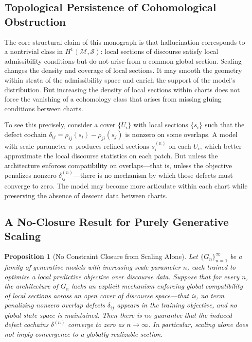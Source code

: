 \documentclass[11pt, oneside]{article}
\newtheorem{proposition}{Proposition}
\begin{document}
\subsection{Topological Persistence of Cohomological Obstruction}

The core structural claim of this monograph is that hallucination corresponds to a nontrivial class in $H^1(\mathcal{M}, \mathcal{S})$: local sections of discourse satisfy local admissibility conditions but do not arise from a common global section. Scaling changes the density and coverage of local sections. It may smooth the geometry within strata of the admissibility space and enrich the support of the model's distribution. But increasing the density of local sections within charts does not force the vanishing of a cohomology class that arises from missing gluing conditions between charts.

To see this precisely, consider a cover $\{U_i\}$ with local sections $\{s_i\}$ such that the defect cochain $\delta_{ij} = \rho_{ij}(s_i) - \rho_{ji}(s_j)$ is nonzero on some overlaps. A model with scale parameter $n$ produces refined sections $s_i^{(n)}$ on each $U_i$, which better approximate the local discourse statistics on each patch. But unless the architecture enforces compatibility on overlaps---that is, unless the objective penalizes nonzero $\delta_{ij}^{(n)}$---there is no mechanism by which those defects must converge to zero. The model may become more articulate within each chart while preserving the absence of descent data between charts.

\subsection{A No-Closure Result for Purely Generative Scaling}

\begin{proposition}[No Constraint Closure from Scaling Alone]
Let $\{G_n\}_{n=1}^\infty$ be a family of generative models with increasing scale parameter $n$, each trained to optimize a local predictive objective over discourse data. Suppose that for every $n$, the architecture of $G_n$ lacks an explicit mechanism enforcing global compatibility of local sections across an open cover of discourse space---that is, no term penalizing nonzero overlap defects $\delta_{ij}$ appears in the training objective, and no global state space is maintained. Then there is no guarantee that the induced defect cochains $\delta^{(n)}$ converge to zero as $n \to \infty$. In particular, scaling alone does not imply convergence to a globally realizable section.
\end{proposition}
\end{document}

